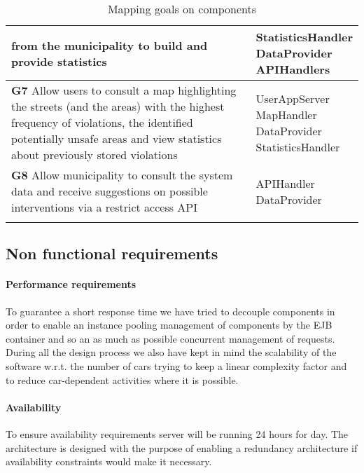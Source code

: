 \begin{longtable}{p{0.7\linewidth}p{0.3\linewidth}}
                from the municipality to build and provide statistics 
                & \mbox{StatisticsHandler} \mbox{DataProvider} \mbox{APIHandlers}\\
            \midrule
                \textbf{G7} Allow users to consult a map highlighting the streets (and the areas) with the highest frequency 
                of violations, the identiﬁed potentially unsafe areas and view statistics about previously stored violations 
                & \mbox{UserAppServer} \mbox{MapHandler} \mbox{DataProvider} \mbox{StatisticsHandler}\\
            \midrule
                \textbf{G8} Allow municipality to consult the system data and receive suggestions on possible interventions via 
                a restrict access API 
                & \mbox{APIHandler} \mbox{DataProvider}\\
            \bottomrule
            \caption{\label{tbl:mappingGoalsOnComponent}Mapping goals on components}
        \end{longtable} 


    \subsection{Non functional requirements}

        \paragraph{Performance requirements}
        To guarantee a short response time we have tried to decouple components in order to enable an instance pooling management of components by the EJB container and so an as much as possible concurrent management of requests. \\
        During all the design process we also have kept in mind the scalability of the software w.r.t. the number of cars trying to keep a linear complexity factor and to reduce car-dependent activities where it is possible.

        \paragraph{Availability}
        To ensure availability requirements server will be running 24 hours for day. The architecture is designed with the purpose of enabling a redundancy architecture if availability constraints would make it necessary.


